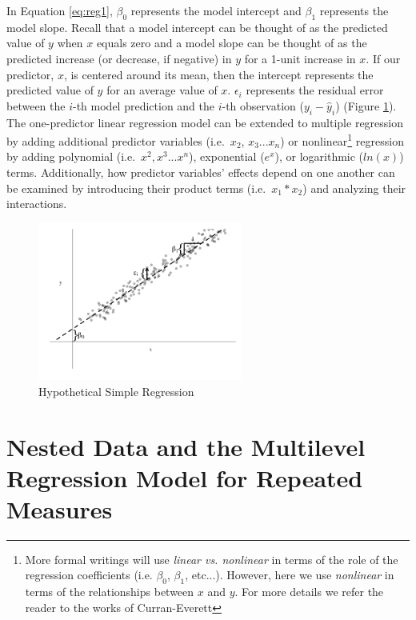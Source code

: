 \documentclass[
]{article}
\begin{document}
\noindent
In Equation \ref{eq:reg1}, \(\beta_{0}\) represents the model intercept and \(\beta_{1}\) represents the model slope. Recall that a model intercept can be thought of as the predicted value of \(y\) when \(x\) equals zero and a model slope can be thought of as the predicted increase (or decrease, if negative) in \(y\) for a 1-unit increase in \(x\). If our predictor, \(x\), is centered around its mean, then the intercept represents the predicted value of \(y\) for an average value of \(x\). \(\epsilon_{i}\) represents the residual error between the \(i\)-th model prediction and the \(i\)-th observation (\(y_{i}-\hat{y}_{i}\)) (Figure \ref{fig1}). The one-predictor linear regression model can be extended to multiple regression by adding additional predictor variables (i.e.~\(x_{2}\), \(x_{3}...x_{n}\)) or nonlinear\footnote{More formal writings will use \textit{linear vs. nonlinear} in terms of the role of the regression coefficients (i.e. $\beta_{0}$, $\beta_{1}$, etc...). However, here we use \textit{nonlinear} in terms of the relationships between $x$ and $y$. For more details we refer the reader to the works of Curran-Everett\cite{curran-everett2011}} regression by adding polynomial (i.e.~\(x^{2}, x^{3}...x^{n}\)), exponential (\(e^{x}\)), or logarithmic (\(ln(x)\)) terms. Additionally, how predictor variables' effects depend on one another can be examined by introducing their product terms (i.e.~\(x_{1}*x_{2}\)) and analyzing their interactions.

\begin{figure}[h]
\centering
\captionsetup{width=0.6\textwidth}
\includegraphics[width=0.6\textwidth]{fig1.png}
\caption{Hypothetical Simple Regression}
\label{fig1}
\end{figure}

\hypertarget{nested-data-and-the-multilevel-regression-model-for-repeated-measures}{%
\section{Nested Data and the Multilevel Regression Model for Repeated Measures}\label{nested-data-and-the-multilevel-regression-model-for-repeated-measures}}
\end{document}
